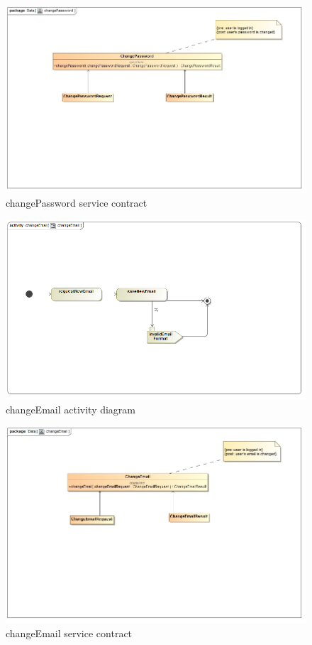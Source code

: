 \documentclass[a4paper,12pt]{article}
\begin{document}
\begin{figure}[H]
	\centering
	\includegraphics[width=1.0\textwidth]{images/changePasswordSC.jpg}
	\caption{changePassword service contract}
\end{figure}

\begin{figure}[H]
  \centering
    \includegraphics[width=1.0\textwidth]{images/changeEmail.png} 
    \caption{changeEmail activity diagram}
\end{figure}
	
\begin{figure}[H]
	\centering
	\includegraphics[width=1.0\textwidth]{images/changeEmailSC.jpg}
	\caption{changeEmail service contract}
\end{figure}
\end{document}
